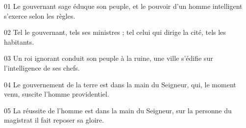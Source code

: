 01 Le gouvernant sage éduque son peuple, et le pouvoir d’un homme intelligent s’exerce selon les règles.

02 Tel le gouvernant, tels ses ministres ; tel celui qui dirige la cité, tels les habitants.

03 Un roi ignorant conduit son peuple à la ruine, une ville s’édifie sur l’intelligence de ses chefs.

04 Le gouvernement de la terre est dans la main du Seigneur, qui, le moment venu, suscite l’homme providentiel.

05 La réussite de l’homme est dans la main du Seigneur, sur la personne du magistrat il fait reposer sa gloire.
